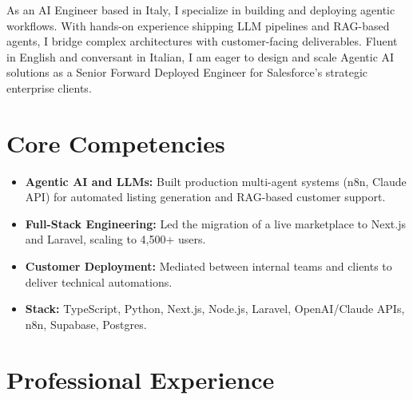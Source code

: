 \documentclass[11pt,a4paper,sans]{moderncv}
\begin{document}
\makecvtitle

As an AI Engineer based in Italy, I specialize in building and deploying agentic workflows. With hands-on experience shipping LLM pipelines and RAG-based agents, I bridge complex architectures with customer-facing deliverables. Fluent in English and conversant in Italian, I am eager to design and scale Agentic AI solutions as a Senior Forward Deployed Engineer for Salesforce's strategic enterprise clients.

\vspace{1pt}
\section{Core Competencies}
\vspace{1pt}
\begin{itemize}
\item \textbf{Agentic AI and LLMs:} Built production multi-agent systems (n8n, Claude API) for automated listing generation and RAG-based customer support.
\item \textbf{Full-Stack Engineering:} Led the migration of a live marketplace to Next.js and Laravel, scaling to 4,500+ users.
\item \textbf{Customer Deployment:} Mediated between internal teams and clients to deliver technical automations.
\item \textbf{Stack:} TypeScript, Python, Next.js, Node.js, Laravel, OpenAI/Claude APIs, n8n, Supabase, Postgres.
\end{itemize}

\vspace{1pt}
\section{Professional Experience}
\vspace{1pt}

\end{document}
